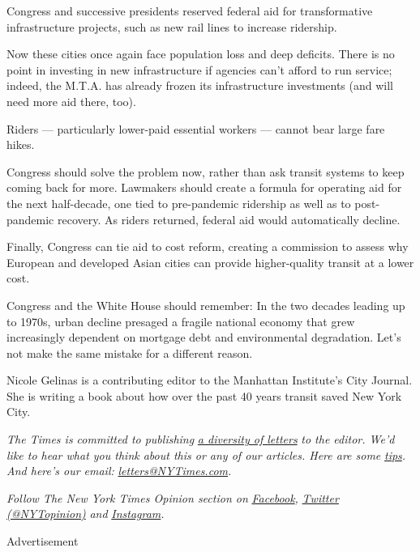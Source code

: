 Congress and successive presidents reserved federal aid for
transformative infrastructure projects, such as new rail lines to
increase ridership.

Now these cities once again face population loss and deep deficits.
There is no point in investing in new infrastructure if agencies can't
afford to run service; indeed, the M.T.A. has already frozen its
infrastructure investments (and will need more aid there, too).

Riders --- particularly lower-paid essential workers --- cannot bear
large fare hikes.

Congress should solve the problem now, rather than ask transit systems
to keep coming back for more. Lawmakers should create a formula for
operating aid for the next half-decade, one tied to pre-pandemic
ridership as well as to post-pandemic recovery. As riders returned,
federal aid would automatically decline.

Finally, Congress can tie aid to cost reform, creating a commission to
assess why European and developed Asian cities can provide
higher-quality transit at a lower cost.

Congress and the White House should remember: In the two decades leading
up to 1970s, urban decline presaged a fragile national economy that grew
increasingly dependent on mortgage debt and environmental degradation.
Let's not make the same mistake for a different reason.

Nicole Gelinas is a contributing editor to the Manhattan Institute's
City Journal. She is writing a book about how over the past 40 years
transit saved New York City.

\emph{The Times is committed to publishing}
\href{https://www.nytimes3xbfgragh.onion/2019/01/31/opinion/letters/letters-to-editor-new-york-times-women.html}{\emph{a
diversity of letters}} \emph{to the editor. We'd like to hear what you
think about this or any of our articles. Here are some}
\href{https://help.nytimes3xbfgragh.onion/hc/en-us/articles/115014925288-How-to-submit-a-letter-to-the-editor}{\emph{tips}}\emph{.
And here's our email:}
\href{mailto:letters@NYTimes.com}{\emph{letters@NYTimes.com}}\emph{.}

\emph{Follow The New York Times Opinion section on}
\href{https://www.facebookcorewwwi.onion/nytopinion}{\emph{Facebook}}\emph{,}
\href{http://twitter.com/NYTOpinion}{\emph{Twitter (@NYTopinion)}}
\emph{and}
\href{https://www.instagram.com/nytopinion/}{\emph{Instagram}}\emph{.}

Advertisement


